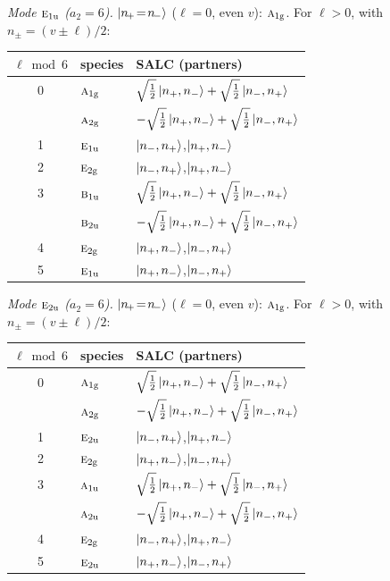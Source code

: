 \documentclass[11pt]{article}
\newcommand{\irr}[1]{\text{\normalfont\scshape #1}}
\newcommand{\ptag}[1]{\mathrm{#1}}
\begin{document}
\emph{Mode $\irr{e}_{1\ptag{u}}$ ($a_2=6$).} $\ket{n_{\!+}\!=\!n_{\!-}}$ ($\ell=0$, even $v$): $\irr{a}_{1\ptag{g}}$. For $\ell>0$, with $n_\pm=(v\pm\ell)/2$:
\begin{longtable}{c l l}\hline $\ell\bmod 6$ & species & SALC (partners)\\ \hline\endhead
0 & $\irr{a}_{1\ptag{g}}$ & $\sqrt{\tfrac{1}{2}}\ket{n_+,n_-}+\sqrt{\tfrac{1}{2}}\ket{n_-,n_+}$\\
 & $\irr{a}_{2\ptag{g}}$ & $-\sqrt{\tfrac{1}{2}}\ket{n_+,n_-}+\sqrt{\tfrac{1}{2}}\ket{n_-,n_+}$\\
1 & $\irr{e}_{1\ptag{u}}$ & $\ket{n_-,n_+}$,\quad $\ket{n_+,n_-}$\\
2 & $\irr{e}_{2\ptag{g}}$ & $\ket{n_-,n_+}$,\quad $\ket{n_+,n_-}$\\
3 & $\irr{b}_{1\ptag{u}}$ & $\sqrt{\tfrac{1}{2}}\ket{n_+,n_-}+\sqrt{\tfrac{1}{2}}\ket{n_-,n_+}$\\
 & $\irr{b}_{2\ptag{u}}$ & $-\sqrt{\tfrac{1}{2}}\ket{n_+,n_-}+\sqrt{\tfrac{1}{2}}\ket{n_-,n_+}$\\
4 & $\irr{e}_{2\ptag{g}}$ & $\ket{n_+,n_-}$,\quad $\ket{n_-,n_+}$\\
5 & $\irr{e}_{1\ptag{u}}$ & $\ket{n_+,n_-}$,\quad $\ket{n_-,n_+}$\\
\hline\end{longtable}

\emph{Mode $\irr{e}_{2\ptag{u}}$ ($a_2=6$).} $\ket{n_{\!+}\!=\!n_{\!-}}$ ($\ell=0$, even $v$): $\irr{a}_{1\ptag{g}}$. For $\ell>0$, with $n_\pm=(v\pm\ell)/2$:
\begin{longtable}{c l l}\hline $\ell\bmod 6$ & species & SALC (partners)\\ \hline\endhead
0 & $\irr{a}_{1\ptag{g}}$ & $\sqrt{\tfrac{1}{2}}\ket{n_+,n_-}+\sqrt{\tfrac{1}{2}}\ket{n_-,n_+}$\\
 & $\irr{a}_{2\ptag{g}}$ & $-\sqrt{\tfrac{1}{2}}\ket{n_+,n_-}+\sqrt{\tfrac{1}{2}}\ket{n_-,n_+}$\\
1 & $\irr{e}_{2\ptag{u}}$ & $\ket{n_-,n_+}$,\quad $\ket{n_+,n_-}$\\
2 & $\irr{e}_{2\ptag{g}}$ & $\ket{n_+,n_-}$,\quad $\ket{n_-,n_+}$\\
3 & $\irr{a}_{1\ptag{u}}$ & $\sqrt{\tfrac{1}{2}}\ket{n_+,n_-}+\sqrt{\tfrac{1}{2}}\ket{n_-,n_+}$\\
 & $\irr{a}_{2\ptag{u}}$ & $-\sqrt{\tfrac{1}{2}}\ket{n_+,n_-}+\sqrt{\tfrac{1}{2}}\ket{n_-,n_+}$\\
4 & $\irr{e}_{2\ptag{g}}$ & $\ket{n_-,n_+}$,\quad $\ket{n_+,n_-}$\\
5 & $\irr{e}_{2\ptag{u}}$ & $\ket{n_+,n_-}$,\quad $\ket{n_-,n_+}$\\
\hline\end{longtable}
\end{document}
